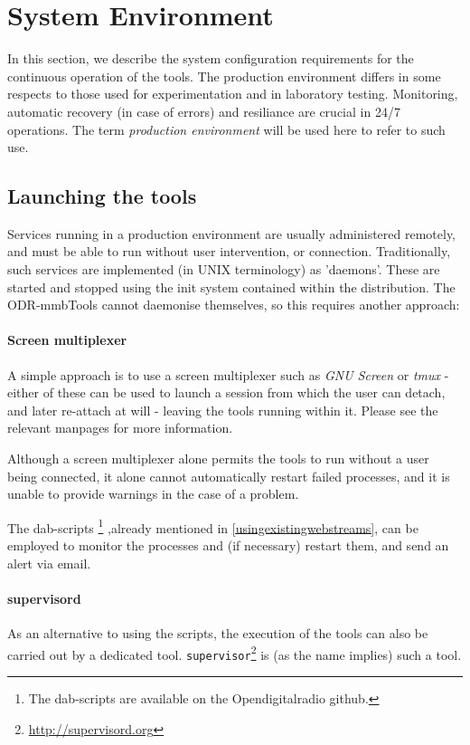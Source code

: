 \section{System Environment}

In this section, we describe the system configuration requirements for the 
continuous operation of the tools. The production environment differs in some 
respects to those used for experimentation and in laboratory testing. Monitoring,
automatic recovery (in case of errors) and resiliance are crucial in 24/7 
operations. The term \emph{production environment} will be used here to refer to
such use.

\subsection{Launching the tools}

Services running in a production environment are usually administered remotely,
and must be able to run without user intervention, or connection. Traditionally,
such services are implemented (in UNIX terminology) as 'daemons'. These are 
started and stopped using the init system contained within the distribution. 
The ODR-mmbTools cannot daemonise themselves, so this requires another approach:

\paragraph{Screen multiplexer}
A simple approach is to use a screen multiplexer such as \emph{GNU Screen} or
\emph{tmux} - either of these can be used to launch a session from which the 
user can detach, and later re-attach at will - leaving the tools running within 
it. Please see the relevant manpages for more information.

Although a screen multiplexer alone permits the tools to run without a user 
being connected, it alone cannot automatically restart failed processes, and it
is unable to provide warnings in the case of a problem. 

The dab-scripts \footnote{The dab-scripts are available on the Opendigitalradio 
github.} ,already mentioned in \ref{usingexistingwebstreams}, can be employed to
monitor the processes and (if necessary) restart them, and send an alert via 
email.

\paragraph{supervisord}
As an alternative to using the scripts, the execution of the tools can also be 
carried out by a dedicated tool. \texttt{supervisor}\footnote{\url{http://supervisord.org}}
is (as the name implies) such a tool.

